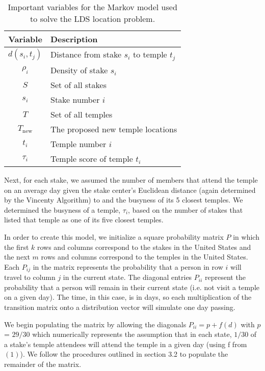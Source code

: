 \documentclass[twoside,twocolumn]{article}
\begin{document}
\begin{table}
\begin{tabular}{c | l}
Variable & Description\\
\hline
$d(s_i,t_j)$ & Distance from stake $s_i$ to temple $t_j$\\
$\rho_i$ & Density of stake $s_i$\\
$S$ & Set of all stakes\\
$s_i$ & Stake number $i$\\
$T$ & Set of all temples\\
$T_{\text{new}}$ & The proposed new temple locations\\
$t_i$ & Temple number $i$ \\
$\tau_i$ & Temple score of temple $t_i$\\
\end{tabular}
\caption{Important variables for the Markov model used to solve the LDS location problem.}
\end{table}

Next, for each stake, we assumed the number of members that attend the temple on an average day given the stake center's Euclidean distance (again determined by the Vincenty Algorithm) to and the busyness of its 5 closest temples.
We determined the busyness of a temple, $\tau_i$, based on the number of stakes that listed that temple as one of its five closest temples. %

In order to create this model, we initialize a square probability matrix $P$ in which the first $k$ rows and columns correspond to the stakes in the United States and the next $m$ rows and columns correspond to the temples in the United States.
Each $P_{ij}$ in the matrix represents the probability that a person in row $i$ will travel to column $j$ in the current state.
The diagonal entries $P_{ii}$ represent the probability that a person will remain in their current state (i.e. not visit a temple on a given day).
The time, in this case, is in days, so each multiplication of the transition matrix onto a distribution vector will simulate one day passing.


We begin populating the matrix by allowing the diagonals $P_{ii} = p + f(d)$ with $p$ = $29/30$ which numerically represents the assumption that in each state, $1/30$ of a stake's temple attendees will attend the temple in a given day (using f from $(1)$).
We follow the procedures outlined in section 3.2 to populate the remainder of the matrix.
\end{document}
